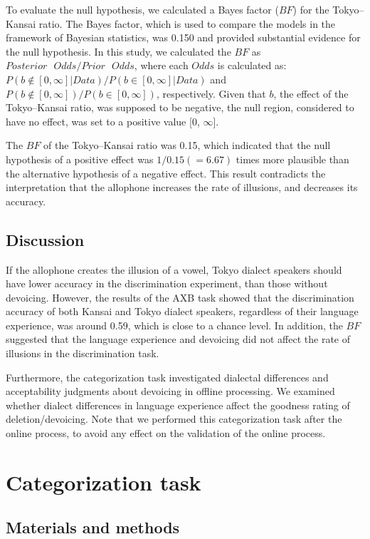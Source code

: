 \documentclass[a4paper,11pt,twocolumn]{article}
\begin{document}
To evaluate the null hypothesis, we calculated a Bayes factor ($BF$) for the Tokyo--Kansai ratio. The Bayes factor, which is used to compare the models in the framework of Bayesian statistics, was 0.150 and provided substantial evidence for the null hypothesis. In this study, we calculated the $BF$ as $Posterior \text{ }Odds / Prior \text{ }Odds$, where each $Odds$ is calculated as: $P(b\notin[0, \infty] | Data)/P(b\in[0, \infty] | Data)$ and $P(b\notin[0, \infty])/P(b\in[0, \infty])$, respectively. Given that $b$, the effect of the Tokyo--Kansai ratio, was supposed to be negative, the null region\cite{kruschke2010believe}, considered to have no effect, was set to a positive value [0, $\infty$].

The $BF$ of the Tokyo--Kansai ratio was 0.15, which indicated that the null hypothesis of a positive effect was $1/0.15(=6.67)$ times more plausible than the alternative hypothesis of a negative effect. This result contradicts the interpretation that the allophone increases the rate of illusions, and decreases its accuracy.

\subsection{Discussion}

If the allophone creates the illusion of a vowel, Tokyo dialect speakers should have lower accuracy in the discrimination experiment, than those without devoicing. However, the results of the AXB task showed that the discrimination accuracy of both Kansai and Tokyo dialect speakers, regardless of their language experience, was around 0.59, which is close to a chance level. In addition, the $BF$ suggested that the language experience and devoicing did not affect the rate of illusions in the discrimination task.

Furthermore, the categorization task investigated dialectal differences and acceptability judgments about devoicing in offline processing. We examined whether dialect differences in language experience affect the goodness rating of deletion/devoicing. Note that we performed this categorization task after the online process, to avoid any effect on the validation of the online process.

\section{Categorization task}

\subsection{Materials and methods}
\end{document}

